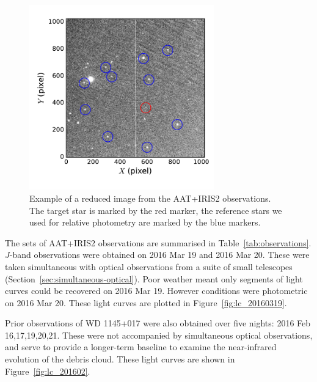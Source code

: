 \documentclass[useAMS,usenatbib]{mn2e}
\begin{document}
\begin{figure}
    \centering  
    \includegraphics[width=8cm]{plots/reference.pdf}
    \caption{Example of a reduced image from the AAT+IRIS2 observations. The target star is marked by the red marker, the reference stars we used for relative photometry are marked by the blue markers.}
    \label{fig:refstars_field}
\end{figure}


The sets of AAT+IRIS2 observations are summarised in Table~\ref{tab:observations}. $J$-band observations were obtained on 2016 Mar 19 and 2016 Mar 20. These were taken simultaneous with optical observations from a suite of small telescopes (Section~\ref{sec:simultaneous-optical}). Poor weather meant only segments of light curves could be recovered on 2016 Mar 19. However conditions were photometric on 2016 Mar 20. These light curves are plotted in Figure~\ref{fig:lc_20160319}.

Prior observations of WD 1145+017 were also obtained over five nights: 2016 Feb 16,17,19,20,21. These were not accompanied by simultaneous optical observations, and serve to provide a longer-term baseline to examine the near-infrared evolution of the debris cloud. These light curves are shown in Figure~\ref{fig:lc_201602}.
\end{document}
